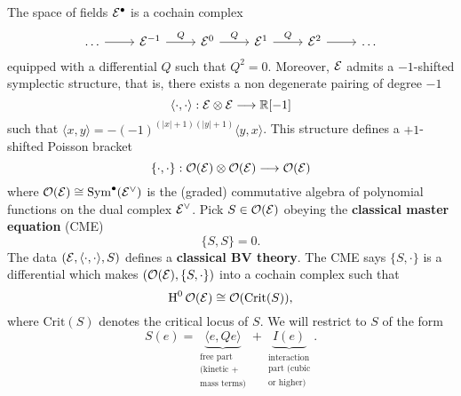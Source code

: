The space of fields $\mathcal{E}^\bullet$ is a cochain complex
\begin{equation*}
  \begin{tikzcd}
    \dots \arrow[r] &
    \Ecal^{-1} \arrow[r, "Q"] &
    \Ecal^0 \arrow[r, "Q"] &
    \Ecal^1 \arrow[r, "Q"] &
    \Ecal^2 \arrow[r] &
    \dots
  \end{tikzcd}
\end{equation*}
equipped with a differential $Q$ such that $Q^2 = 0$. Moreover, $\mathcal{E}$ admits a $-1$-shifted symplectic structure, that is, there exists a non degenerate pairing of degree $-1$
\begin{equation*}
  \langle \cdot , \cdot \rangle :
  \mathcal{E} \otimes \mathcal{E} \longrightarrow \mathbb{R} [-1]
\end{equation*}
such that $\langle x, y \rangle = -(-1)^{(|x|+1)(|y|+1)} \langle y, x \rangle$. This structure defines a $+1$-shifted Poisson bracket
\begin{equation*}
  \{ \cdot, \cdot \} :
  \mathcal{O}( \mathcal{E} ) \otimes \mathcal{O}( \mathcal{E} ) \longrightarrow \mathcal{O}( \mathcal{E} )
\end{equation*}
where $\mathcal{O} ( \mathcal{E} ) \cong \mathrm{Sym}^\bullet (\mathcal{E}^\vee)$ is the (graded) commutative algebra of polynomial functions on the dual complex $\mathcal{E}^\vee$. Pick $S \in \mathcal{O} (\mathcal{E})$ obeying the \textbf{classical master equation} (CME)
\begin{equation}
  \label{eq:cme}
  \{ S, S \} = 0.
\end{equation}
The data $(\mathcal{E}, \langle \cdot, \cdot \rangle, S)$ defines a \textbf{classical BV theory}. The CME says $\{ S, \cdot \}$ is a differential which makes $(\mathcal{O} ( \mathcal{E} ), \{S, \cdot \} )$ into a cochain complex such that
\begin{equation*}
  \operatorname{H}^0 \mathcal{O} ( \mathcal{E} ) \cong
  \mathcal{O}( \mathrm{Crit} (S) ),
\end{equation*}
where $\mathrm{Crit} (S)$ denotes the critical locus of $S$. We will restrict to $S$ of the form
\begin{equation*}
S(e) = \underbrace{\langle e, Qe \rangle}_{\substack{ \text{free part} \\ \text{(kinetic +} \\ \text{mass terms)} }}
+ \underbrace{I(e)}_{\substack{ \text{interaction} \\ \text{part (cubic} \\ \text{or higher)} }}.
\end{equation*}

